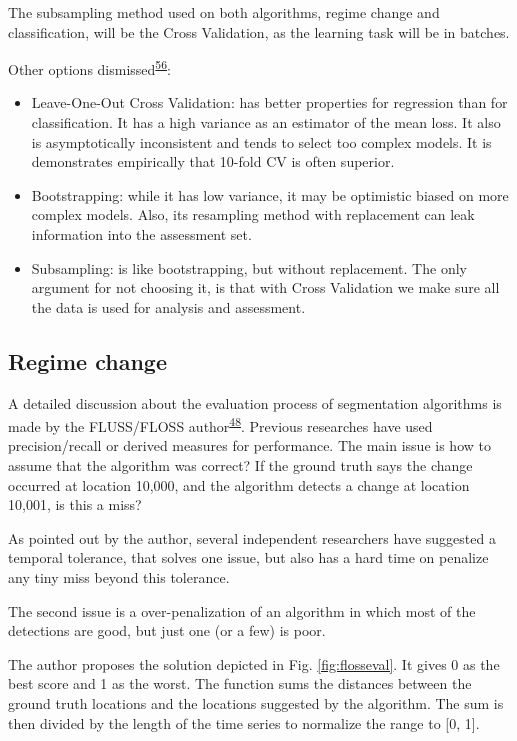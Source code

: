\documentclass[12pt,twoside]{fmupthesis}
\begin{document}
The subsampling method used on both algorithms, regime change and classification, will be
the Cross Validation, as the learning task will be in batches.

Other options dismissed\textsuperscript{\protect\hyperlink{ref-Bischl2012}{56}}:
\begin{itemize}
\item
  Leave-One-Out Cross Validation: has better properties for regression than for classification. It
  has a high variance as an estimator of the mean loss. It also is asymptotically inconsistent and
  tends to select too complex models. It is demonstrates empirically that 10-fold CV is often
  superior.
\item
  Bootstrapping: while it has low variance, it may be optimistic biased on more complex models.
  Also, its resampling method with replacement can leak information into the assessment set.
\item
  Subsampling: is like bootstrapping, but without replacement. The only argument for not choosing
  it, is that with Cross Validation we make sure all the data is used for analysis and assessment.
\end{itemize}
\hypertarget{regime-change}{%
\subsection{Regime change}\label{regime-change}}

A detailed discussion about the evaluation process of segmentation algorithms is made by the
FLUSS/FLOSS author\textsuperscript{\protect\hyperlink{ref-gharghabi2018}{48}}. Previous researches have used precision/recall or derived
measures for performance. The main issue is how to assume that the algorithm was correct? If the
ground truth says the change occurred at location 10,000, and the algorithm detects a change at
location 10,001, is this a miss?

As pointed out by the author, several independent researchers have suggested a temporal tolerance,
that solves one issue, but also has a hard time on penalize any tiny miss beyond this tolerance.

The second issue is a over-penalization of an algorithm in which most of the detections are
good, but just one (or a few) is poor.

The author proposes the solution depicted in Fig. \ref{fig:flosseval}. It gives 0 as the best score
and 1 as the worst. The function sums the distances between the ground truth locations and the
locations suggested by the algorithm. The sum is then divided by
the length of the time series to normalize the range to {[}0, 1{]}.
\end{document}
